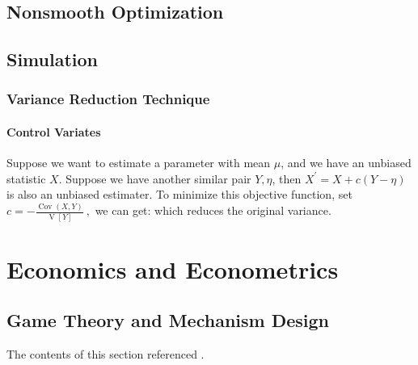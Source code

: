 \documentclass[10pt]{report}
\begin{document}
\clearpage
\section{Nonsmooth Optimization}

\clearpage
\section{Simulation}

\subsection{Variance Reduction Technique}

\subsubsection{Control Variates}
Suppose we want to estimate a parameter with mean $\mu$, and we have an unbiased statistic $X$. Suppose we have another similar pair $Y,\eta$,
then $X^{\prime}=X+c(Y-\eta)$ is also an unbiased estimater.
To minimize this objective function, set $c=-\frac{\operatorname{Cov}(X,Y)}{\operatorname{V}[Y]}\mathrm{~,}$ we can get:
which reduces the original variance.

\clearpage
\chapter{Economics and Econometrics}

\section{Game Theory and Mechanism Design}

The contents of this section referenced \cite{fudenberg1991game}.
\end{document}
